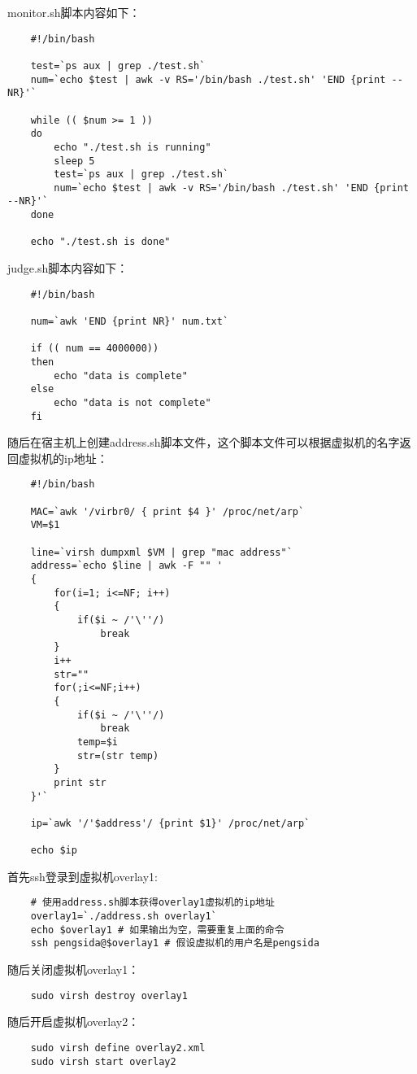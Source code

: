 \documentclass[a4paper,left=1.5cm,right=1.5cm,11pt]{article}
\begin{document}
	monitor.sh脚本内容如下：
	\begin{lstlisting}
	#!/bin/bash

	test=`ps aux | grep ./test.sh`
	num=`echo $test | awk -v RS='/bin/bash ./test.sh' 'END {print --NR}'`

	while (( $num >= 1 )) 
	do
		echo "./test.sh is running"
		sleep 5
		test=`ps aux | grep ./test.sh`
		num=`echo $test | awk -v RS='/bin/bash ./test.sh' 'END {print --NR}'`
	done

	echo "./test.sh is done"
	\end{lstlisting}

	judge.sh脚本内容如下：
	\begin{lstlisting}
	#!/bin/bash

	num=`awk 'END {print NR}' num.txt`

	if (( num == 4000000)) 
	then
		echo "data is complete"
	else
		echo "data is not complete"
	fi
	\end{lstlisting}

	随后在宿主机上创建address.sh脚本文件，这个脚本文件可以根据虚拟机的名字返回虚拟机的ip地址：
	\begin{lstlisting}
	#!/bin/bash

	MAC=`awk '/virbr0/ { print $4 }' /proc/net/arp`
	VM=$1

	line=`virsh dumpxml $VM | grep "mac address"`
	address=`echo $line | awk -F "" '
	{
		for(i=1; i<=NF; i++)
		{
			if($i ~ /'\''/)
				break
		}
		i++
		str=""
		for(;i<=NF;i++)
		{
			if($i ~ /'\''/)
				break
			temp=$i
			str=(str temp)
		}
		print str
	}'`

	ip=`awk '/'$address'/ {print $1}' /proc/net/arp`

	echo $ip
	\end{lstlisting}

	首先ssh登录到虚拟机overlay1:
	\begin{lstlisting}
	# 使用address.sh脚本获得overlay1虚拟机的ip地址
	overlay1=`./address.sh overlay1`
	echo $overlay1 # 如果输出为空，需要重复上面的命令
	ssh pengsida@$overlay1 # 假设虚拟机的用户名是pengsida
	\end{lstlisting}

	随后关闭虚拟机overlay1：
	\begin{lstlisting}
	sudo virsh destroy overlay1
	\end{lstlisting}

	随后开启虚拟机overlay2：
	\begin{lstlisting}
	sudo virsh define overlay2.xml
	sudo virsh start overlay2
	\end{lstlisting}
\end{document}
